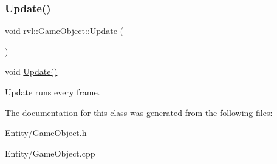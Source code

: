 \subsubsection{\texorpdfstring{Update()}{Update()}}
{\footnotesize\ttfamily void rvl\+::\+Game\+Object\+::\+Update (\begin{DoxyParamCaption}{ }\end{DoxyParamCaption})}



void \hyperlink{classrvl_1_1_game_object_a3d0364d2a33aaadb0a00e530bd7d54c3}{Update()} 

Update runs every frame. 

The documentation for this class was generated from the following files\+:\begin{DoxyCompactItemize}
\item 
Entity/Game\+Object.\+h\item 
Entity/Game\+Object.\+cpp\end{DoxyCompactItemize}
